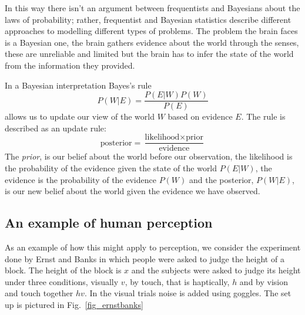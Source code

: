 \documentclass{article}
\begin{document}
In this way there isn't an argument between frequentists and Bayesians
about the laws of probability; rather, frequentist and Bayesian
statistics describe different approaches to modelling different types
of problems. The problem the brain faces is a Bayesian one, the brain
gathers evidence about the world through the senses, these are
unreliable and limited but the brain has to infer the state of the
world from the information they provided.

In a Bayesian interpretation Bayes's rule 
\begin{equation}
P(W|E)=\frac{P(E|W)P(W)}{P(E)}
\end{equation}
allows us to update our view of the world $W$ based on evidence $E$. The rule is described as an update rule:
\begin{equation}
\mbox{posterior}=\frac{\mbox{likelihood}\times \mbox{prior}}{\mbox{evidence}}
\end{equation}
The \textsl{prior}, is our belief about the world before our
observation, the likelihood is the probability of the evidence given
the state of the world $P(E|W)$, the evidence is the probability of
the evidence $P(W)$ and the posterior, $P(W|E)$, is our new belief
about the world given the evidence we have observed.

\subsection*{An example of human perception}

As an example of how this might apply to perception, we consider the
experiment done by Ernst and Banks \cite{ErnstBanks2002} in which
people were asked to judge the height of a block. The height of the
block is $x$ and the subjects were asked to judge its height under
three conditions, visually $v$, by touch, that is haptically, $h$ and
by vision and touch together $hv$. In the visual trials noise is added
using goggles. The set up is pictured in Fig.~\ref{fig_ernstbanks}
\end{document}
